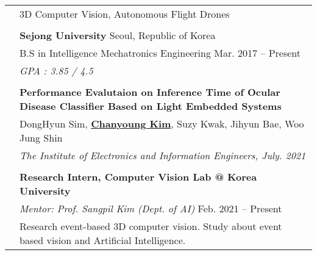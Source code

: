 \documentclass[letterpaper, 11pt]{article}
\begin{document}
\begin{longtable}{p{1.3in}p{4.8in}}


\nohyphens{\color{Violet}{Research interests}}
& 3D Computer Vision, Autonomous Flight Drones \\
& \\


\color{Violet}{Education} 
& \textbf{Sejong University} \hfill Seoul, Republic of Korea \\ 
& B.S in Intelligence Mechatronics Engineering \hfill Mar. 2017 -- Present \\
& {\it GPA : 3.85 / 4.5}\\
& \\




\nohyphens{\color{Violet}{Publications}} 

& \textbf{Performance Evalutaion on Inference 
Time of Ocular Disease Classifier Based on Light Embedded 
Systems} \\
& DongHyun Sim, \uline{\textbf{Chanyoung Kim}}, Suzy Kwak, Jihyun Bae, Woo Jung 
Shin \\
& \textit{The Institute of Electronics and Information Engineers, July. 
2021}\\
& \\



\nohyphens{\color{Violet}{Research experience}} 
& \textbf{Research Intern, Computer Vision Lab @ Korea University} \\
& {\it Mentor: Prof. Sangpil Kim (Dept. of AI)} \hfill Feb. 2021 -- Present \\
& Research event-based 3D computer vision. Study about event based vision and Artificial Intelligence.
& \\


\end{longtable}
\end{document}
